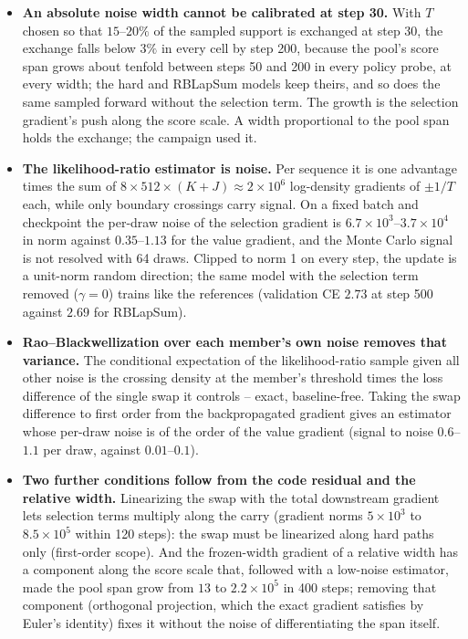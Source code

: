 \documentclass[11pt,a4paper]{article}
\begin{document}
\begin{itemize}[leftmargin=1.4em]
\item \textbf{An absolute noise width cannot be calibrated at step 30.} With
$T$ chosen so that $15$--$20\%$ of the sampled support is exchanged at step 30,
the exchange falls below $3\%$ in every cell by step 200, because the pool's
score span grows about tenfold between steps 50 and 200 in every policy probe,
at every width; the hard and RBLapSum models keep theirs, and so does the same
sampled forward without the selection term. The growth is the selection
gradient's push along the score scale. A width proportional to the pool span
holds the exchange; the campaign used it.

\item \textbf{The likelihood-ratio estimator is noise.} Per sequence it is one
advantage times the sum of $8 \times 512 \times (K{+}J) \approx 2 \times 10^6$
log-density gradients of $\pm 1/T$ each, while only boundary crossings carry
signal. On a fixed batch and checkpoint the per-draw noise of the selection
gradient is $6.7 \times 10^3$--$3.7 \times 10^4$ in norm against $0.35$--$1.13$
for the value gradient, and the Monte Carlo signal is not resolved with 64
draws. Clipped to norm 1 on every step, the update is a unit-norm random
direction; the same model with the selection term removed ($\gamma = 0$) trains
like the references (validation CE $2.73$ at step 500 against $2.69$ for
RBLapSum).

\item \textbf{Rao--Blackwellization over each member's own noise removes that
variance.} The conditional expectation of the likelihood-ratio sample given all
other noise is the crossing density at the member's threshold times the loss
difference of the single swap it controls -- exact, baseline-free. Taking the
swap difference to first order from the backpropagated gradient gives an
estimator whose per-draw noise is of the order of the value gradient (signal
to noise $0.6$--$1.1$ per draw, against $0.01$--$0.1$).

\item \textbf{Two further conditions follow from the code residual and the
relative width.} Linearizing the swap with the total downstream gradient lets
selection terms multiply along the carry (gradient norms $5 \times 10^3$ to
$8.5 \times 10^5$ within 120 steps): the swap must be linearized along hard
paths only (first-order scope). And the frozen-width gradient of a relative width has a component along
the score scale that, followed with a low-noise estimator, made the pool span
grow from $13$ to $2.2 \times 10^5$ in 400 steps; removing that component
(orthogonal projection, which the exact gradient satisfies by Euler's identity)
fixes it without the noise of differentiating the span itself.


\end{itemize}
\end{document}
